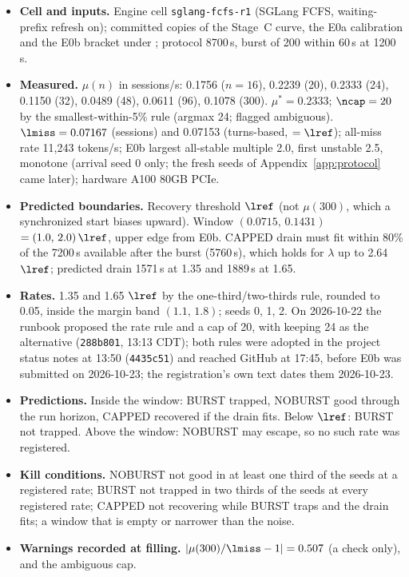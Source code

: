 \begin{itemize}
\item \textbf{Cell and inputs.} Engine cell \texttt{sglang-fcfs-r1} (SGLang FCFS, waiting-prefix refresh on); committed copies of the Stage~C curve, the E0a calibration and the E0b bracket under ; protocol 8700\,s, burst of 200 within 60\,s at 1200\,s.
\item \textbf{Measured.} $\mu(n)$ in sessions/s: 0.1756 ($n=16$), 0.2239 (20), 0.2333 (24), 0.1150 (32), 0.0489 (48), 0.0611 (96), 0.1078 (300). $\mu^*=0.2333$; $\ncap=20$ by the smallest-within-5\% rule (argmax 24; flagged ambiguous). $\lmiss=0.07167$ (sessions) and 0.07153 (turns-based, $=\lref$); all-miss rate 11,243 tokens/s; E0b largest all-stable multiple 2.0, first unstable 2.5, monotone (arrival seed 0 only; the fresh seeds of Appendix~\ref{app:protocol} came later); hardware A100 80GB PCIe.
\item \textbf{Predicted boundaries.} Recovery threshold $\lref$ (not $\mu(300)$, which a synchronized start biases upward). Window $(0.0715,\,0.1431)$\sps{} $=(1.0,\,2.0)\,\lref$, upper edge from E0b. CAPPED drain must fit within 80\% of the 7200\,s available after the burst (5760\,s), which holds for $\lambda$ up to 2.64 $\lref$; predicted drain 1571\,s at 1.35 and 1889\,s at 1.65.
\item \textbf{Rates.} 1.35 and 1.65 $\lref$ by the one-third/two-thirds rule, rounded to 0.05, inside the margin band $(1.1,\,1.8)$; seeds 0, 1, 2. On 2026-10-22 the runbook proposed the rate rule and a cap of 20, with keeping 24 as the alternative (\texttt{288b801}, 13:13 CDT); both rules were adopted in the project status notes at 13:50 (\texttt{4435c51}) and reached GitHub at 17:45, before E0b was submitted on 2026-10-23; the registration's own text dates them 2026-10-23.
\item \textbf{Predictions.} Inside the window: BURST trapped, NOBURST good through the run horizon, CAPPED recovered if the drain fits. Below $\lref$: BURST not trapped. Above the window: NOBURST may escape, so no such rate was registered.
\item \textbf{Kill conditions.} NOBURST not good in at least one third of the seeds at a registered rate; BURST not trapped in two thirds of the seeds at every registered rate; CAPPED not recovering while BURST traps and the drain fits; a window that is empty or narrower than the noise.
\item \textbf{Warnings recorded at filling.} $|\mu(300)/\lmiss-1|=0.507$ (a check only), and the ambiguous cap.
\end{itemize}

